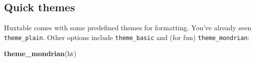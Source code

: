 \documentclass[]{article}
\newenvironment{Shaded}{\begin{snugshade}}{\end{snugshade}}
\newcommand{\KeywordTok}[1]{\textcolor[rgb]{0.13,0.29,0.53}{\textbf{#1}}}
\newcommand{\NormalTok}[1]{#1}
\begin{document}
\FloatBarrier

\hypertarget{quick-themes}{%
\subsection{Quick themes}\label{quick-themes}}

Huxtable comes with some predefined themes for formatting. You've
already seen \texttt{theme\_plain}. Other options include
\texttt{theme\_basic} and (for fun) \texttt{theme\_mondrian}:

\begin{Shaded}
\begin{Highlighting}[]
\KeywordTok{theme_mondrian}\NormalTok{(ht)}
\end{Highlighting}
\end{Shaded}

 
  \providecommand{\huxb}[2]{\arrayrulecolor[RGB]{#1}\global\arrayrulewidth=#2pt}
  \providecommand{\huxvb}[2]{\color[RGB]{#1}\vrule width #2pt}
  \providecommand{\huxtpad}[1]{\rule{0pt}{\baselineskip+#1}}
  \providecommand{\huxbpad}[1]{\rule[-#1]{0pt}{#1}}
\end{document}
